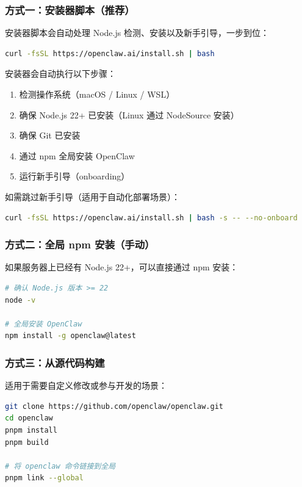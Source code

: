 \subsubsection{方式一：安装器脚本（推荐）}

安装器脚本会自动处理 Node.js 检测、安装以及新手引导，一步到位：

\begin{lstlisting}[language=bash]
curl -fsSL https://openclaw.ai/install.sh | bash
\end{lstlisting}

安装器会自动执行以下步骤：
\begin{enumerate}
  \item 检测操作系统（macOS / Linux / WSL）
  \item 确保 Node.js 22+ 已安装（Linux 通过 NodeSource 安装）
  \item 确保 Git 已安装
  \item 通过 npm 全局安装 OpenClaw
  \item 运行新手引导（onboarding）
\end{enumerate}

如需跳过新手引导（适用于自动化部署场景）：

\begin{lstlisting}[language=bash]
curl -fsSL https://openclaw.ai/install.sh | bash -s -- --no-onboard
\end{lstlisting}

\subsubsection{方式二：全局 npm 安装（手动）}

如果服务器上已经有 Node.js 22+，可以直接通过 npm 安装：

\begin{lstlisting}[language=bash]
# 确认 Node.js 版本 >= 22
node -v

# 全局安装 OpenClaw
npm install -g openclaw@latest
\end{lstlisting}

\subsubsection{方式三：从源代码构建}

适用于需要自定义修改或参与开发的场景：

\begin{lstlisting}[language=bash]
git clone https://github.com/openclaw/openclaw.git
cd openclaw
pnpm install
pnpm build

# 将 openclaw 命令链接到全局
pnpm link --global
\end{lstlisting}

